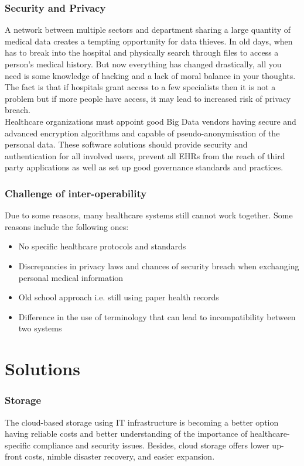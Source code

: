 \documentclass[10pt,a4paper,twoside]{article}
\begin{document}
\subsubsection*{Security and Privacy }
A network between multiple sectors and department sharing a large quantity of medical data creates a tempting opportunity for data thieves. In old days, when has to break into the hospital and physically search through files to access a person’s medical history. But now everything has changed drastically, all you need is some knowledge of hacking and a lack of moral balance in your thoughts. The fact is that if hospitals grant access to a few specialists then it is not a problem but if more people have access, it may lead to increased risk of privacy breach.  \\

Healthcare organizations must appoint good Big Data vendors having secure and advanced encryption algorithms and capable of pseudo-anonymisation of the personal data. These software solutions should provide security and authentication for all involved users, prevent all EHRs from the reach of third party applications as well as set up good governance standards and practices.

\pagebreak

\subsubsection*{Challenge of inter-operability}
Due to some reasons, many healthcare systems still cannot work together. 
Some reasons include the following ones: 

\begin{itemize}
    \item No specific healthcare protocols and standards 
    \item Discrepancies in privacy laws and chances of security breach when exchanging personal medical information 
    \item Old school approach i.e. still using paper health records 
    \item Difference in the use of terminology that can lead to incompatibility between two systems
\end{itemize}

\section*{Solutions}

\subsubsection*{Storage}
The cloud-based storage using IT infrastructure is becoming a better option having reliable costs and better understanding of the importance of healthcare-specific compliance and security issues. Besides, cloud storage offers lower up-front costs, nimble disaster recovery, and easier expansion.
\end{document}
